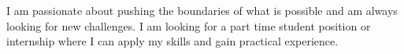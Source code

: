 

\begin{cvparagraph}

I am passionate about pushing the boundaries of what is possible and am always looking for new challenges.
I am looking for a part time student position or internship where I can apply my skills and gain practical experience.
\end{cvparagraph}
